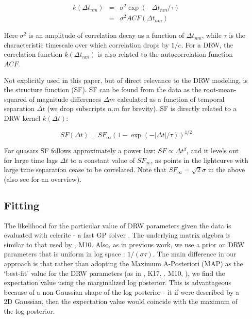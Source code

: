 \documentclass[twocolumn]{aastex62}
\newcommand{\project}[1]{\textsf{#1}}
\begin{document}
\begin{eqnarray}
k(\Delta t_{nm}) &=& \sigma^{2}\exp{(-\Delta t_{nm} / \tau)}  \nonumber \\
                 &=& \sigma^{2} ACF(\Delta t_{nm})\nonumber
\end{eqnarray} 

Here $\sigma^{2}$ is an amplitude of correlation decay as a function of $\Delta t_{nm}$,  while $\tau$ is the characteristic timescale over which correlation drops by $1/e$. For a DRW,  the correlation function $k(\Delta t_{nm})$ is also related to the autocorrelation function $ACF$. 

Not explicitly used in this paper, but of direct relevance to the DRW modeling, is the structure function (SF). SF can be found from the data as the root-mean-squared of  magnitude differences $\Delta m$  calculated as a function of temporal separation $\Delta t$ (we drop subscripts $n$,$m$ for brevity). SF is directly related to a DRW kernel $k(\Delta t)$:

\begin{equation}
SF(\Delta t) = SF_{\infty} (1-\exp{(-|\Delta t|/\tau)})^{1/2}
\end{equation}

For quasars SF follows approximately a power law: $SF \propto \Delta t^{\beta}$,  and it levels out for large time lags $\Delta t$ to a constant value of $SF_{\infty}$, as points in the lightcurve with large time separation cease to be correlated.   Note that $SF_\infty = \sqrt{2} \sigma$  in the above (also see \citet{macleod2012, bauer2009, graham2015a} for an overview).


\subsection{Fitting}
The likelihood for the particular value of DRW parameters given the data is evaluated with   \project{celerite}  - a fast GP solver \citep{foreman2017}. The underlying matrix algebra is similar to that used by \cite{rybicki1992, kozlowski2010},  M10. Also, as in previous work, we use a prior on DRW parameters that is  uniform  in log space :  $1 / (\sigma \tau)$. The main difference in our approach is that rather than adopting the Maximum A-Posteriori (MAP) as the `best-fit' value for the DRW parameters (as in \citealt{kozlowski2010}, K17, \citealt{kozlowski2016b}, M10, \citealt{macleod2011}),  we find the expectation value using the marginalized log posterior. This is advantageous because of a non-Gaussian shape of the log posterior - it if were described by a 2D Gaussian,  then the expectation value would coincide with the maximum of the log posterior.
\end{document}
